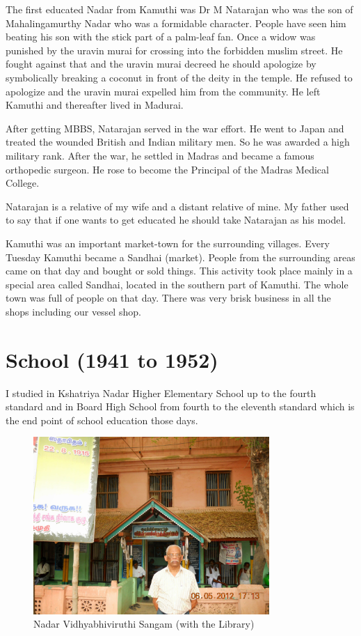 The first educated Nadar from Kamuthi was Dr M Natarajan who was the son 
of Mahalingamurthy Nadar who was a formi\-dable character. People have 
seen him beating his son with the stick part of a palm-leaf fan. Once a 
widow was punished by the uravin murai for crossing into the forbidden 
muslim street. He fought against that and the uravin murai decreed he 
should apologize by symbolically breaking a coconut in front of the 
dei\-ty in the temple. He refused to apologize and the uravin murai 
expelled him from the community. He left Kamuthi and thereafter lived in 
Madurai.

After getting MBBS, Natarajan served in the war effort. He went to Japan 
and treated the wounded British and Indian mili\-tary men. So he was 
awarded a high military rank. After the war, he settled in Madras and 
became a famous orthopedic surgeon. He rose to become the Principal of 
the Madras Medical College.

Natarajan is a relative of my wife and a distant relative of mine. My 
father used to say that if one wants to get educated he should take 
Natarajan as his model.

Kamuthi was an important market-town for the surroun\-ding villages. Every 
Tuesday Kamuthi became a Sandhai (market). People from the surrounding 
areas came on that day and bought or sold things. This activity took 
place mainly in a special area called Sandhai, located in the southern 
part of Kamuthi. The whole town was full of people on that day. There 
was very brisk business in all the shops including our vessel shop.
\vspace{-\topsep}
\section*{School (1941 to 1952)}

I studied in Kshatriya Nadar Higher Elementary School up to the fourth
standard and in Board High School from fourth to the eleventh standard
which is the end point of school education those days.

\vspace{-\topsep}
\begin{figure}[H]
\centering
\includegraphics[width=0.8\textwidth]{images/new-images/03-Rajaji-lib.jpg}
\caption{\small{Nadar Vidhyabhiviruthi Sangam (with the Library)}}
\end{figure}
\vspace{-\topsep}


